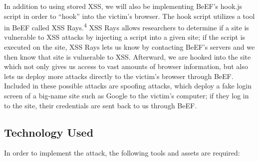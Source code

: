 \documentclass{article}
\begin{document}
    \vspace{8pt}

    In addition to using stored XSS, we will also be implementing BeEF's hook.js script in order to ``hook'' into the victim's browser. The hook script utilizes a tool in BeEF called XSS Rays.\textsuperscript{4} XSS Rays allows researchers to determine if a site is vulnerable to XSS attacks by injecting a script into a given site; if the script is executed on the site, XSS Rays lets us know by contacting BeEF's servers and we then know that site is vulnerable to XSS. Afterward, we are hooked into the site which not only gives us access to vast amounts of browser information, but also lets us deploy more attacks directly to the victim's browser through BeEF. Included in these possible attacks are spoofing attacks, which deploy a fake login screen of a big-name site such as Google to the victim's computer; if they log in to the site, their credentials are sent back to us through BeEF.

    \subsection*{Technology Used}

    In order to implement the attack, the following tools and assets are required:
\end{document}
